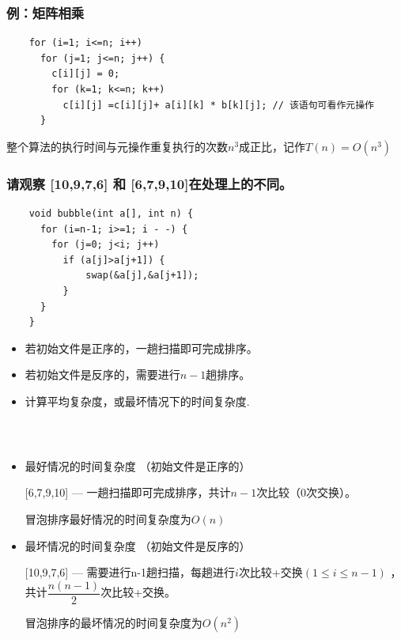 \begin{frame}[fragile]
  \frametitle{例：矩阵相乘}
  \begin{verbatim}
    for (i=1; i<=n; i++)
      for (j=1; j<=n; j++) {
        c[i][j] = 0;
        for (k=1; k<=n; k++)
          c[i][j] =c[i][j]+ a[i][k] * b[k][j]; // 该语句可看作元操作
      }
  \end{verbatim}

  \begin{tcolorbox}
    整个算法的执行时间与元操作重复执行的次数$n^3$成正比，记作$T(n) = O(n^3)$
  \end{tcolorbox}
\end{frame}

\begin{frame}[fragile]
  \frametitle{请观察 [10,9,7,6] 和 [6,7,9,10]在处理上的不同。}
  \begin{verbatim}
    void bubble(int a[], int n) {
      for (i=n-1; i>=1; i - -) {
        for (j=0; j<i; j++)
          if (a[j]>a[j+1]) {
              swap(&a[j],&a[j+1]);
          }
      }
    }
  \end{verbatim}

  \pause

  \begin{itemize}
  \item 若初始文件是正序的，一趟扫描即可完成排序。
  \item 若初始文件是反序的，需要进行$n-1$趟排序。
  \item \color{red}计算平均复杂度，或最坏情况下的时间复杂度.
  \end{itemize}
\end{frame}

\begin{frame}[fragile]
  \frametitle{~}
  \begin{itemize}
    \item 最好情况的时间复杂度 （初始文件是正序的）

      [6,7,9,10] --- 一趟扫描即可完成排序，共计$n-1$次比较（0次交换）。

      冒泡排序最好情况的时间复杂度为$O(n)$

   \item 最坏情况的时间复杂度 （初始文件是反序的）

     [10,9,7,6] --- 需要进行n-1趟扫描，每趟进行$i$次比较+交换$(1\leq i \leq n-1)$ ，共计$\dfrac{n (n-1)}{2}$次比较+交换。

     冒泡排序的最坏情况的时间复杂度为$O(n^2)$

  \end{itemize}
\end{frame}

